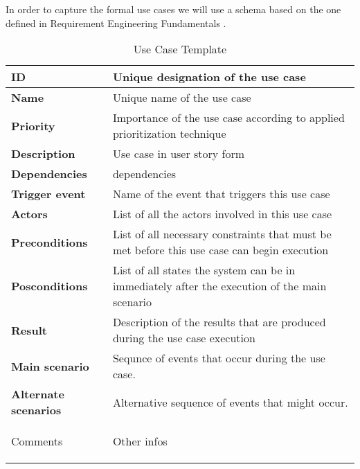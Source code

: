 In order to capture the formal use cases we will use a schema based on the one defined in Requirement Engineering Fundamentals \cite{9781937538774}.


\begin{table}[H]
    \begin{tabular}{ | >{\bfseries}l | p{8.35cm} |}
    \hline
    ID &  Unique designation of the use case \\ \hline
    Name & Unique name of the use case \\ \hline
    Priority & Importance of the use case according to applied prioritization technique \\ \hline
    Description &  Use case in user story form\\ \hline
    Dependencies & dependencies \\ \hline
    Trigger event & Name of the event that triggers this use case \\ \hline
    Actors & List of all the actors involved in this use case \\ \hline
    Preconditions & List of all necessary constraints that must be met before this use case can begin execution \\ \hline
    Posconditions & List of all states the system can be in immediately after the execution of the main scenario  \\ \hline
    Result & Description of the results that are produced during the use case execution \\ \hline
    Main scenario & Sequnce of events that occur during the use case. \\ \hline
    Alternate scenarios & Alternative sequence of events that might occur. \\ \hline

    Comments & Other infos \\ \hline
    \end{tabular}

    \caption{Use Case Template}
    \label{fig:uc_template}
\end{table}






